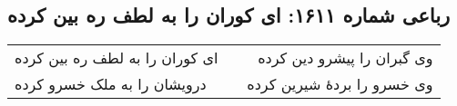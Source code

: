\begin{center}
\section*{رباعی شماره ۱۶۱۱: ای کوران را به لطف ره بین کرده}
\label{sec:1611}
\begin{longtable}{l p{0.5cm} r}
ای کوران را به لطف ره بین کرده
&&
وی گبران را پیشرو دین کرده
\\
درویشان را به ملک خسرو کرده
&&
وی خسرو را بردهٔ شیرین کرده
\\
\end{longtable}
\end{center}
